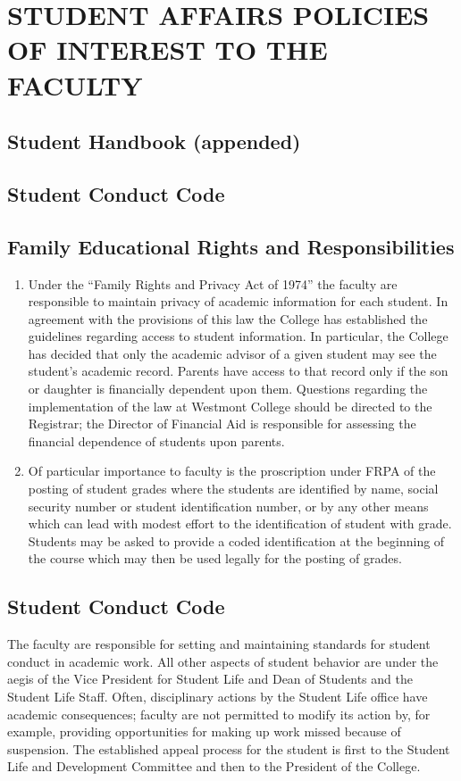
\section{STUDENT AFFAIRS POLICIES OF INTEREST TO THE FACULTY}
	\subsection{Student Handbook (appended)}
	\subsection{Student Conduct Code}
	\subsection{Family Educational Rights and Responsibilities}
		\begin{enumerate}[label=\alph*)]
			\item{Under the ``Family Rights and Privacy Act of 1974'' the faculty are responsible to maintain privacy of academic information for each student.  In agreement with the provisions of this law the College has established the guidelines regarding access to student information.  In particular, the College has decided that only the academic advisor of a given student may see the student's academic record.  Parents have access to that record only if the son or daughter is financially dependent upon them.  Questions regarding the implementation of the law at Westmont College should be directed to the Registrar; the Director of Financial Aid is responsible for assessing the financial dependence of students upon parents.
			}

			\item{Of particular importance to faculty is the proscription under FRPA of the posting of student grades where the students are identified by name, social security number or student identification number, or by any other means which can lead with modest effort to the identification of student with grade.  Students may be asked to provide a coded identification at the beginning of the course which may then be used legally for the posting of grades.
			}
		\end{enumerate}
	\subsection{Student Conduct Code}
		The faculty are responsible for setting and maintaining standards for student conduct in academic work.  All other aspects of student behavior are under the aegis of the Vice President for Student Life and Dean of Students and the Student Life Staff.  Often, disciplinary actions by the Student Life office have academic consequences; faculty are not permitted to modify its action by, for example, providing opportunities for making up work missed because of suspension.  The established appeal process for the student is first to the Student Life and Development Committee and then to the President of the College.
